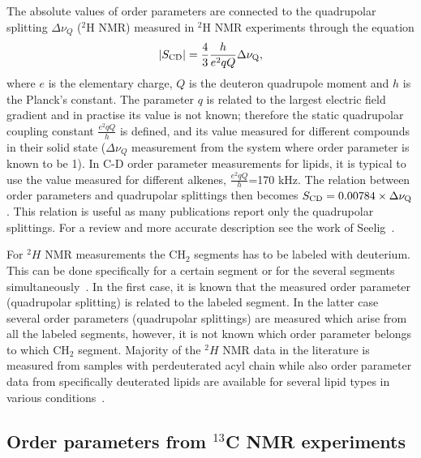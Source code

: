 \documentclass[aps,prl,superscriptaddress,twocolumn]{revtex4}
\begin{document}
The absolute values of order parameters are connected to the quadrupolar splitting $\Delta \nu_Q$ ($^2$H NMR) 
measured in $^2$H NMR experiments through the equation 
\begin{equation}\label{HNMRop}
|S_{{\rm CD}}|=\frac{4}{3} \frac{h}{e^2qQ} \Delta \nu_{{\rm Q}}, 
\end{equation}
where $e$ is the elementary charge, $Q$ is the deuteron quadrupole moment and $h$ is the Planck's constant. 
The parameter $q$ is related to the largest electric field gradient and in practise its value is not known; 
therefore the static quadrupolar coupling constant $\frac{e^2qQ}{h}$ is defined, and its value measured for 
different compounds in their solid state ($\Delta \nu_Q$ measurement from the system where order parameter is known to be 1). 
In C-D order parameter measurements for lipids, it is typical to 
use the value measured for different alkenes, $\frac{e^2qQ}{h}$=170 kHz. The relation between order parameters 
and quadrupolar splittings then becomes $S_{{\rm CD}}=0.00784 \times \Delta \nu_{{\rm Q}}$.
This relation is useful as many publications report only the quadrupolar splittings. For a review and more accurate description see the work of Seelig~\cite{seelig77c}.

For $^2H$ NMR measurements the CH$_2$ segments has to be labeled with deuterium.
This can be done specifically for a certain segment or for the several segments
simultaneously~\cite{davis83,bloom91,leftin11}. In the first case, it is known that the measured
order parameter (quadrupolar splitting) is related to the labeled segment.
In the latter case several order parameters (quadrupolar splittings) are
measured which arise from all the labeled segments, however, it is not known 
which order parameter belongs to which CH$_2$ segment. Majority of the $^2H$ NMR data
in the literature is measured from samples with perdeuterated acyl chain \cite{leftin11,marsh13}
while also order parameter data from specifically deuterated lipids are available for 
several lipid types in various conditions~\cite{seelig74,seelig75,seelig77,seelig78,gally81,akutsu81,altenbach84,scherer89,kuchinka89,roux90,ulrich94,douliez95}.

\subsection{Order parameters from $^{13}$C NMR experiments}\label{CopSECTION}
\end{document}
